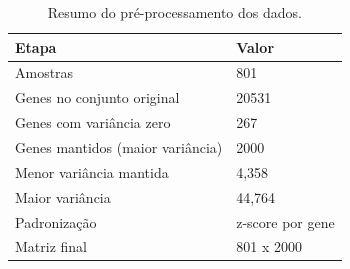 \begin{table}[htbp]
\caption{Resumo do pré-processamento dos dados.}
\label{tab:preprocessamento}
\begin{tabular}{ll}
\toprule
Etapa & Valor \\
\midrule
Amostras & 801 \\
Genes no conjunto original & 20531 \\
Genes com variância zero & 267 \\
Genes mantidos (maior variância) & 2000 \\
Menor variância mantida & 4,358 \\
Maior variância & 44,764 \\
Padronização & z-score por gene \\
Matriz final & 801 x 2000 \\
\bottomrule
\end{tabular}
\end{table}
